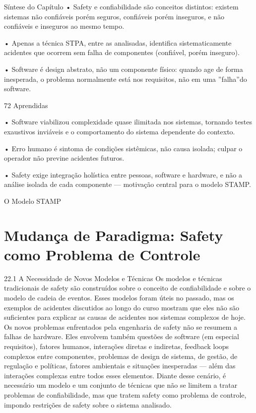 Síntese do Capítulo • Safety e confiabilidade são conceitos distintos: existem sistemas não confiáveis porém seguros, confiáveis porém inseguros, e não confiáveis e inseguros ao mesmo tempo.

• Apenas a técnica STPA, entre as analisadas, identifica sistematicamente acidentes que ocorrem sem falha de componentes (confiável, porém inseguro).

• Software é design abstrato, não um componente físico: quando age de forma inesperada, o problema normalmente está nos requisitos, não em uma ”falha”do software.

72 Aprendidas

• Software viabilizou complexidade quase ilimitada nos sistemas, tornando testes exaustivos inviáveis e o comportamento do sistema dependente do contexto.

• Erro humano é sintoma de condições sistêmicas, não causa isolada; culpar o operador não previne acidentes futuros.

• Safety exige integração holística entre pessoas, software e hardware, e não a análise isolada de cada componente — motivação central para o modelo STAMP.

O Modelo STAMP

\chapter{Mudança de Paradigma: Safety como Problema de Controle}

22.1 A Necessidade de Novos Modelos e Técnicas Os modelos e técnicas tradicionais de safety são construídos sobre o conceito de confiabilidade e sobre o modelo de cadeia de eventos. Esses modelos foram úteis no passado, mas os exemplos de acidentes discutidos ao longo do curso mostram que eles não são suficientes para explicar as causas de acidentes nos sistemas complexos de hoje. Os novos problemas enfrentados pela engenharia de safety não se resumem a falhas de hardware. Eles envolvem também questões de software (em especial requisitos), fatores humanos, interações diretas e indiretas, feedback loops complexos entre componentes, problemas de design de sistema, de gestão, de regulação e políticas, fatores ambientais e situações inesperadas — além das interações complexas entre todos esses elementos. Diante desse cenário, é necessário um modelo e um conjunto de técnicas que não se limitem a tratar problemas de confiabilidade, mas que tratem safety como problema de controle, impondo restrições de safety sobre o sistema analisado.

